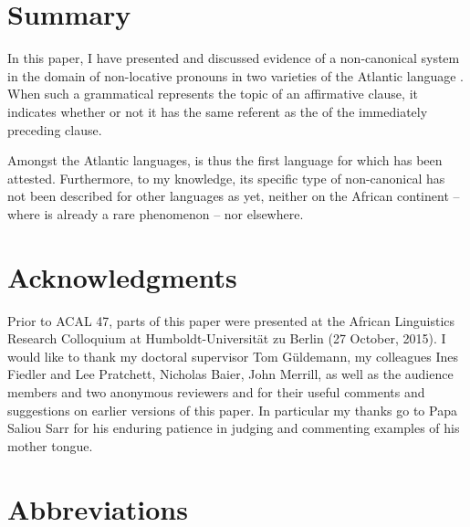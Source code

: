 \documentclass[output=paper
,newtxmath
,modfonts
,nonflat]{langsci/langscibook}
\begin{document}
\section{Summary}\label{sec:apel:4}

In this paper, I have presented and discussed evidence of a non-canonical  system in the domain of non-locative   pronouns in two varieties of the Atlantic language . When such a grammatical  represents the topic of an affirmative clause, it indicates whether or not it has the same referent as the  of the immediately preceding clause.

Amongst the Atlantic languages,  is thus the first language for which  has been attested. Furthermore, to my knowledge, its specific type of non-canonical  has not been described for other languages as yet, neither on the African continent -- where  is already a rare phenomenon \citep[3]{Treis2012} -- nor elsewhere.

\section*{Acknowledgments}

Prior to ACAL 47, parts of this paper were presented at the African Linguistics Research Colloquium at Humboldt-Universität zu Berlin (27 October, 2015). I would like to thank my doctoral supervisor Tom Güldemann, my colleagues Ines Fiedler and Lee Pratchett, Nicholas Baier, John Merrill, as well as the audience members and two anonymous reviewers and for their useful comments and suggestions on earlier versions of this paper. In particular my thanks go to Papa Saliou Sarr for his enduring patience in judging and commenting examples of his mother tongue.

\section*{Abbreviations}
\end{document}
